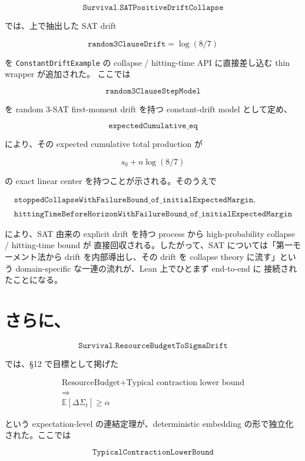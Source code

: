 \documentclass[12pt,a4paper]{article}
\begin{document}
\[
\texttt{Survival.SATPositiveDriftCollapse}
\]

では、上で抽出した SAT drift

\[
\texttt{random3ClauseDrift} = \log(8/7)
\]

を \texttt{ConstantDriftExample} の collapse / hitting-time API に直接差し込む thin wrapper が追加された。 ここでは

\[
\texttt{random3ClauseStepModel}
\]

を random 3-SAT first-moment drift を持つ constant-drift model として定め、

\[
\texttt{expectedCumulative\_eq}
\]

により、その expected cumulative total production が

\[
s_0 + n\log(8/7)
\]

の exact linear center を持つことが示される。そのうえで

\[
\begin{aligned}
\texttt{stoppedCollapseWithFailureBound\_of\_initialExpectedMargin}, \\
\qquad \\
\texttt{hittingTimeBeforeHorizonWithFailureBound\_of\_initialExpectedMargin}
\end{aligned}
\]

により、SAT 由来の explicit drift を持つ process から high-probability collapse / hitting-time bound が 直接回収される。したがって、SAT については「第一モーメント法から drift を内部導出し、その drift を collapse theory に流す」という domain-specific な一連の流れが、Lean 上でひとまず end-to-end に 接続されたことになる。

\section{さらに、}\label{ux3055ux3089ux306b-13}

\[
\texttt{Survival.ResourceBudgetToSigmaDrift}
\]

では、§12 で目標として掲げた

\[
\begin{aligned}
\text{ResourceBudget} + \text{Typical contraction lower bound} \\
\Longrightarrow \\
\mathbb E[\Delta \Sigma_{t}] \ge \alpha
\end{aligned}
\]

という expectation-level の連結定理が、deterministic embedding の形で独立化された。ここでは

\[
\texttt{TypicalContractionLowerBound}
\]
\end{document}
